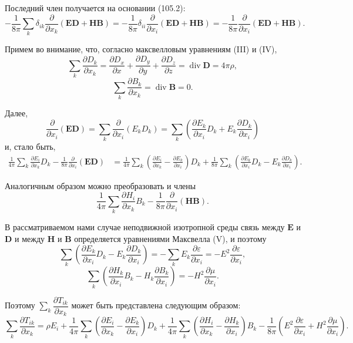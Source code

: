 \documentclass[a4paper,12pt]{article}
\begin{document}
Последний член получается на основании (105.2):
$$
    -\frac{1}{8\pi}\sum_k\delta_{ik}\frac{\partial}{\partial x_k}(\mathbf{ED} + \mathbf{HB})
    = -\frac{1}{8\pi}\delta_{ii}\frac{\partial}{\partial x_i}(\mathbf{ED} + \mathbf{HB})
    = -\frac{1}{8\pi}\frac{\partial}{\partial x_i}(\mathbf{ED} + \mathbf{HB}).
$$


Примем во внимание, что, согласно максвелловым уравнениям (III) и (IV),
$$
    \sum_k\frac{\partial D_k}{\partial x_k}
    = \frac{\partial D_x}{\partial x} + \frac{\partial D_y}{\partial y}
    + \frac{\partial D_z}{\partial z} = \operatorname{div}\mathbf{D} = 4\pi\rho,
$$
$$
    \sum_k\frac{\partial B_k}{\partial x_k} = \operatorname{div}\mathbf{B} = 0.
$$

Далее,
$$
    \frac{\partial}{\partial x_i}(\mathbf{ED})
    = \sum_k\frac{\partial}{\partial x_i}(E_k D_k)
    = \sum_k\!\left(\frac{\partial E_k}{\partial x_i}D_k
    + E_k\frac{\partial D_k}{\partial x_i}\right)
$$
и, стало быть,
\begin{align*}
    \frac{1}{4\pi}\sum_k\frac{\partial E_i}{\partial x_k}D_k
    - \frac{1}{8\pi}\frac{\partial}{\partial x_i}(\mathbf{ED})
    &= \frac{1}{4\pi}\sum_k\!\left(\frac{\partial E_i}{\partial x_k}
     - \frac{\partial E_k}{\partial x_i}\right)D_k
     + \frac{1}{8\pi}\sum_k\!\left(\frac{\partial E_k}{\partial x_i}D_k
     - E_k\frac{\partial D_k}{\partial x_i}\right).
\end{align*}

Аналогичным образом можно преобразовать и члены
$$
    \frac{1}{4\pi}\sum_k\frac{\partial H_i}{\partial x_k}B_k
    - \frac{1}{8\pi}\frac{\partial}{\partial x_i}(\mathbf{HB}).
$$

В рассматриваемом нами случае неподвижной изотропной среды связь
между $\mathbf{E}$ и $\mathbf{D}$ и между $\mathbf{H}$ и $\mathbf{B}$
определяется уравнениями Максвелла (V), и поэтому
$$
    \sum_k\!\left(\frac{\partial E_k}{\partial x_i}D_k
    - E_k\frac{\partial D_k}{\partial x_i}\right)
    = -\sum_k E_k\frac{\partial\varepsilon}{\partial x_i}
    = -E^2\frac{\partial\varepsilon}{\partial x_i},
$$
$$
    \sum_k\!\left(\frac{\partial H_k}{\partial x_i}B_k
    - H_k\frac{\partial B_k}{\partial x_i}\right)
    = -H^2\frac{\partial\mu}{\partial x_i}.
$$

Поэтому $\sum_k\dfrac{\partial T_{ik}}{\partial x_k}$ может быть
представлена следующим образом:
\begin{equation}
    \sum_k\frac{\partial T_{ik}}{\partial x_k}
    = \rho E_i + \frac{1}{4\pi}\sum_k\!\left(
        \frac{\partial E_i}{\partial x_k} - \frac{\partial E_k}{\partial x_i}
    \right)D_k
    + \frac{1}{4\pi}\sum_k\!\left(
        \frac{\partial H_i}{\partial x_k} - \frac{\partial H_k}{\partial x_i}
    \right)B_k
    - \frac{1}{8\pi}\!\left(
        E^2\frac{\partial\varepsilon}{\partial x_i}
      + H^2\frac{\partial\mu}{\partial x_i}
    \right).
    \tag{105.3}
\end{equation}
\end{document}
